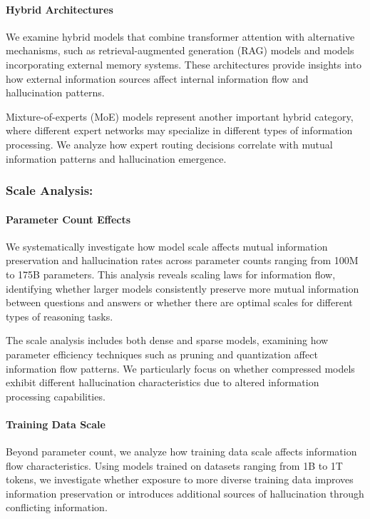 \paragraph{Hybrid Architectures}
We examine hybrid models that combine transformer attention with alternative mechanisms, such as retrieval-augmented generation (RAG) models and models incorporating external memory systems. These architectures provide insights into how external information sources affect internal information flow and hallucination patterns.

Mixture-of-experts (MoE) models represent another important hybrid category, where different expert networks may specialize in different types of information processing. We analyze how expert routing decisions correlate with mutual information patterns and hallucination emergence.

\subsubsection{Scale Analysis:}

\paragraph{Parameter Count Effects}
We systematically investigate how model scale affects mutual information preservation and hallucination rates across parameter counts ranging from 100M to 175B parameters. This analysis reveals scaling laws for information flow, identifying whether larger models consistently preserve more mutual information between questions and answers or whether there are optimal scales for different types of reasoning tasks.

The scale analysis includes both dense and sparse models, examining how parameter efficiency techniques such as pruning and quantization affect information flow patterns. We particularly focus on whether compressed models exhibit different hallucination characteristics due to altered information processing capabilities.

\paragraph{Training Data Scale}
Beyond parameter count, we analyze how training data scale affects information flow characteristics. Using models trained on datasets ranging from 1B to 1T tokens, we investigate whether exposure to more diverse training data improves information preservation or introduces additional sources of hallucination through conflicting information.

